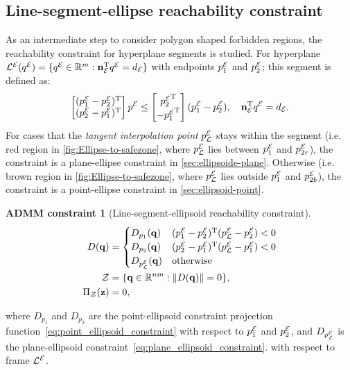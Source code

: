 \documentclass[10pt,twocolumn,twoside]{IEEEtran}
\newtheorem{constraint}{ADMM constraint}
\newcommand{\news}{\color{blue}}
\def\sZ{\mathcal{Z}}
\begin{document}
\subsection{Line-segment-ellipse reachability constraint}\label{chapter:ellipse to segment}

{\news As an intermediate step to consider polygon shaped forbidden regions, the reachability constraint for hyperplane segments is studied.
For hyperplane ${\mathcal{L}^{\mathcal{E}}}({q^{\mathcal{E}}}) = \{ {q^{\mathcal{E}}}\in\mathbb{R}^m:  \mathbf{n}_{\mathcal{E}}^\mathrm{T} {q^{\mathcal{E}}} = d_{\mathcal{E}}\}$ with endpoints ${p_1^{\mathcal{E}}}$ and ${p_2^{\mathcal{E}}}$; this segment is defined as:}
\begin{equation}
\begin{bmatrix}({p_1^{\mathcal{E}}}- {p_2^{\mathcal{E}}})^\mathrm{T}\\( {p_2^{\mathcal{E}}} - {p_1^{\mathcal{E}}})^\mathrm{T}\end{bmatrix}  {p^{\mathcal{E}}} \leq \begin{bmatrix} {p_2^{\mathcal{E}}}^\mathrm{T}\\- {p_1^{\mathcal{E}}}^\mathrm{T}\end{bmatrix}( {p_1^{\mathcal{E}}}- {p_2^{\mathcal{E}}}), \quad \mathbf{n}_{\mathcal{E}}^\mathrm{T} {q^{\mathcal{E}}} = d_{\mathcal{E}}.
\end{equation}
For cases that the \emph{tangent interpolation point} ${p_{\mathcal{L}}^{\mathcal{E}}}$ stays within the segment (i.e. red region in \cref{fig:Ellipse-to-safezone}, where ${p_{\mathcal{L}}^{\mathcal{E}}}$ lies between ${p_{1}^{\mathcal{E}}}$ and ${p_{2r}^{\mathcal{E}}}$), the constraint is a plane-ellipse constraint in \cref{sec:ellipsoide-plane}. Otherwise (i.e. brown region in \cref{fig:Ellipse-to-safezone}, where ${p_{\mathcal{L}}^{\mathcal{E}}}$ lies outside ${p_{1}^{\mathcal{E}}}$ and ${p_{2b}^{\mathcal{E}}}$), the constraint is a point-ellipse constraint in \cref{sec:ellipsoid-point}.

\begin{constraint}[Line-segment-ellipsoid reachability constraint]
\begin{align}
D(\vq) &=  \begin{cases}
D_{p_{1}}(\vq) & (\Eframe{p_1}-\Eframe{p_2})\transpose (\Eframe{p_{\cL}}-\Eframe{p_2})<0\\
D_{p_{2}}(\vq) & (\Eframe{p_2}-\Eframe{p_1})\transpose (\Eframe{p_{\cL}} -\Eframe{p_1})<0\\
D_\Eframe{p_{\cL}}(\vq) & \textrm{otherwise}
\end{cases} \label{eq:segment_ellipsoid_constraint}\\
  \sZ &= \{\vq\in\mathbb{R}^{nm}:\norm{D(\vq)} = 0 \},\\
   \Pi_\sZ(\vz) & = 0, 
\end{align}
\end{constraint}
where $D_{p_{1}}$ and $D_{p_{2}}$ are the point-ellipsoid constraint projection function~\eqref{eq:point_ellipsoid_constraint} with respect to ${p_{1}^{\mathcal{E}}}$ and ${p_{2}^{\mathcal{E}}}$, and $D_{p_{\mathcal{L}}^{\mathcal{E}}}$ is the plane-ellipsoid constraint~\eqref{eq:plane_ellipsoid_constraint}. with respect to frame ${\mathcal{L}^{\mathcal{E}}}$.
\end{document}
